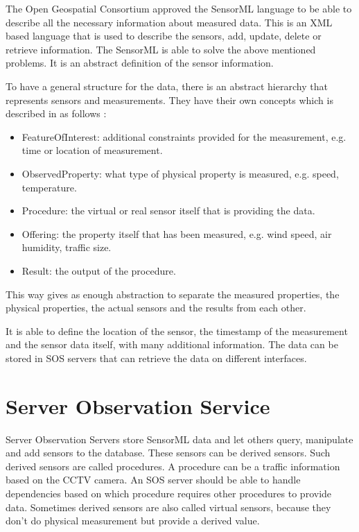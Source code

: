 The Open Geospatial Consortium approved the SensorML language to be able to describe all the necessary information about measured data\cite{sensorml}. This is an XML based language that is used to describe the sensors, add, update, delete or retrieve information. The SensorML is able to solve the above mentioned problems. It is an abstract definition of the sensor information.

To have a general structure for the data, there is an abstract hierarchy that represents sensors and measurements. They have their own concepts which is described in as follows \cite{g2d2}:
\begin{itemize}
\item FeatureOfInterest: additional constraints provided for the measurement, e.g. time or location of measurement.
\item ObservedProperty: what type of physical property is measured, e.g. speed, temperature.
\item Procedure: the virtual or real sensor itself that is providing the data.
\item Offering: the property itself that has been measured, e.g. wind speed, air humidity, traffic size. 
\item Result: the output of the procedure.
\end{itemize}

This way gives as enough abstraction to separate the measured properties, the physical properties, the actual sensors and the results from each other.

It is able to define the location of the sensor, the timestamp of the measurement and the sensor data itself, with many additional information. The data can be stored in SOS servers that can retrieve the data on different interfaces.
 
\section{Server Observation Service}

Server Observation Servers store SensorML data and let others query, manipulate and add sensors to the database. These sensors can be derived sensors. Such derived sensors are called procedures. A procedure can be a traffic information based on the CCTV camera. An SOS server should be able to handle dependencies based on which procedure requires other procedures to provide data. Sometimes derived sensors are also called virtual sensors, because they don't do physical measurement but provide a derived value.

